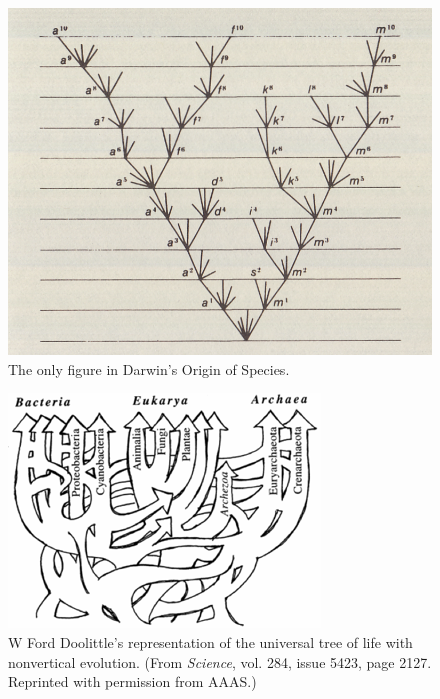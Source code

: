 \begin{figure}
\includegraphics[width=\columnwidth]{./fig/introduction/darwin_origin.png}
\caption[Charles Darwin's Tree]{The only figure in Darwin's Origin of Species.}
\label{fig:darwin_origin}
\end{figure}

\begin{figure}
\includegraphics[width=\columnwidth]{./fig/introduction/doolittle_tree.png}
\caption[Ford Doolittle's Tree]{W Ford Doolittle's representation of the universal tree of life with nonvertical evolution. (From \emph{Science}, vol. 284, issue 5423, page 2127. Reprinted with permission from AAAS.)}
\label{fig:doolittle_tree}
\end{figure}


